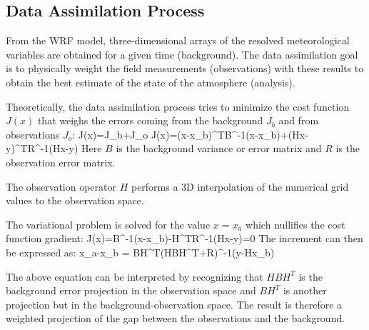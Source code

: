 \subsection{Data Assimilation Process}
From the WRF model, three-dimensional arrays of the resolved meteorological variables are obtained for a given time (background). The data assimilation goal is to physically weight the field measurements (observations) with these results to obtain the best estimate of the state of the atmosphere (analysis).

Theoretically, the data assimilation process tries to minimize the cost function $J(x)$ that weighs the errors coming from the background $J_b$ and from observations $J_o$:
\be
J(x)=J_b+J_o
\ee
\be 
J(x)=(x-x_b)^TB^{-1}(x-x_b)+(Hx-y)^TR^{-1}(Hx-y)
\ee
Here $B$ is the background variance or error matrix and $R$ is the observation error matrix.

The observation operator $H$ performs a 3D interpolation of the numerical grid values to the observation space.

The variational problem is solved for the value $x=x_a$ which nullifies the cost function gradient:
\be 
\nabla J(x)=B^{-1}(x-x_b)-H^TR^{-1}(Hx-y)=0
\ee
The increment can then be expressed as:
\be 
x_a-x_b = BH^T(HBH^T+R)^{-1}(y-Hx_b)
\ee

The above equation can be interpreted by recognizing that $HBH^T$ is the background error projection in the observation space and $BH^T$ is another projection but in the background-observation space. The result is therefore a weighted projection of the gap between the observations and the background.

